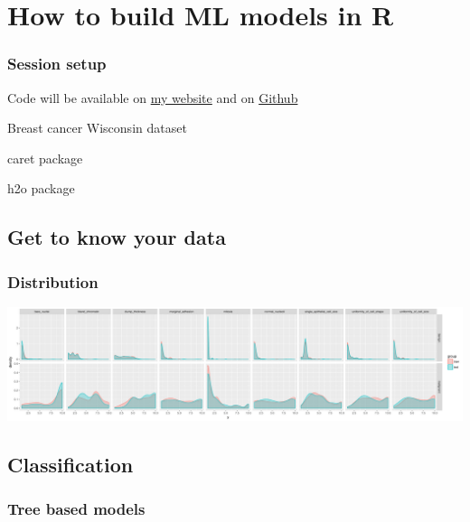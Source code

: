 \documentclass[handout, c, 11pt, xcolor=svgnames, hyperref={colorlinks,citecolor=DeepPink4,linkcolor=DarkRed,urlcolor=DarkBlue}]{beamer} %
\begin{document}



\section{How to build ML models in R}

\begin{frame}
	\frametitle{Session setup}
	
	Code will be available on \href{https://shiring.github.io}{my website} and on \href{https://github.com/ShirinG/Webinar_ML_for_disease}{Github}
	
	Breast cancer Wisconsin dataset
	
	caret package
	
	h2o package
\end{frame}

\subsection{Get to know your data}

\begin{frame}
	\frametitle{Distribution}
	
	\begin{center}\includegraphics[width=1\textwidth]{webinar_code_files/figure-latex/unnamed-chunk-6-1} \end{center}
\end{frame}


\subsection{Classification}

\subsubsection{Tree based models}
\end{document}
